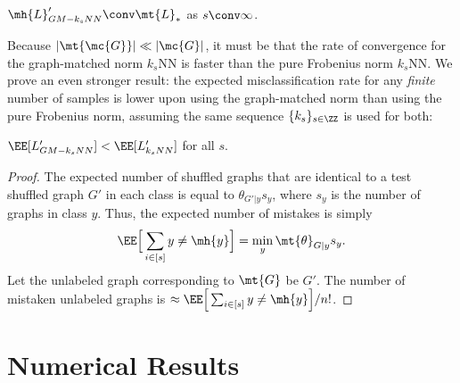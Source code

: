 \begin{coro}
	$\mh{L}_{GM-k_sNN}' \conv \mt{L}_*$ as $s \conv \infty$.
\end{coro}
Because $|\mt{\mc{G}}| \ll |\mc{G}|$, it must be that the rate of convergence for the graph-matched norm $k_s$NN is faster than the pure Frobenius norm $k_s$NN. We prove an even stronger result: the expected misclassification rate for any \emph{finite} number of samples is lower upon using the graph-matched norm than using the pure Frobenius norm, assuming the same sequence $\{k_s\}_{s \in \ZZ}$ is used for both: 
\begin{thm} \label{thm:7}
	$\EE[L_{GM-k_sNN}'] < \EE[L_{k_sNN}']$ for all $s$.
\end{thm}
\begin{proof}
	The expected number of shuffled graphs that are identical to a test shuffled graph $G'$ in each class is equal to $\theta_{G'|y} s_y$, where $s_y$ is the number of graphs in class $y$.  Thus, the expected number of mistakes is simply 
\begin{align}
	\EE\Big[\sum_{i \in [s]} y \neq \mh{y}\Big]=\min_y \mt{\theta}_{G|y} s_y.
\end{align}  
Let the unlabeled graph corresponding to $\mt{G}$ be $G'$.  The number of mistaken unlabeled graphs is  $\approx \EE\Big[\sum_{i \in [s]} y \neq \mh{y}\Big]/n!$.	
\end{proof}





\section{Numerical Results} %
\label{sec:simulated_experiment}

